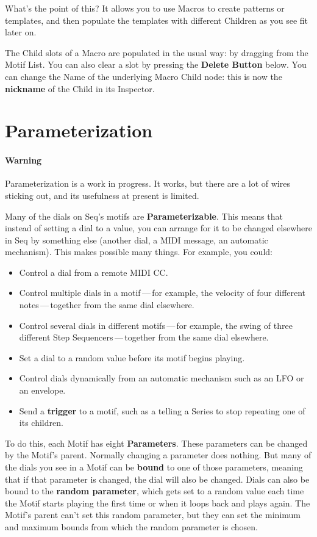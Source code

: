 \documentclass[twoside,10pt]{article}
\begin{document}
What's the point of this?  It allows you to use Macros to create patterns or templates, and then populate the templates with different Children as you see fit later on. 

The Child slots of a Macro are populated in the usual way: by dragging from the Motif List.  You can also clear a slot by pressing the {\bf Delete Button} below.  You can change the Name of the underlying Macro Child node: this is now the {\bf nickname} of the Child in its Inspector.

\clearpage\section{Parameterization}
\label{parameters}

\paragraph{\color{red} Warning}  Parameterization is a work in progress.  It works, but there are a lot of wires sticking out, and its usefulness at present is limited.

\vspace{1em}

Many of the dials on Seq's motifs are {\bf Parameterizable}.  This means that instead of setting a dial to a value, you can arrange for it to be changed elsewhere in Seq by something else (another dial, a MIDI message, an automatic mechanism).  This makes possible many things.  For example, you could:

\begin{itemize}
\item Control a dial from a remote MIDI CC.
\item Control multiple dials in a motif\,---\,for example, the velocity of four different notes\,---\,together from the same dial elsewhere.
\item Control several dials in different motifs\,---\,for example, the swing of three different Step Sequencers\,---\,together from the same dial elsewhere.
\item Set a dial to a random value before its motif begins playing.
\item Control dials dynamically from an automatic mechanism such as an LFO or an envelope.
\item Send a {\bf trigger} to a motif, such as a telling a Series to stop repeating one of its children.
\end{itemize}

To do this, each Motif has eight {\bf Parameters}.   These parameters can be changed by the Motif's parent.  Normally changing a parameter does nothing.  But many of the dials you see in a Motif can be {\bf bound} to one of those parameters, meaning that if that parameter is changed, the dial will also be changed.  Dials can also be bound to the {\bf random parameter}, which gets set to a random value each time the Motif starts playing the first time or when it loops back and plays again.  The Motif's parent can't set this random parameter, but they can set the minimum and maximum bounds from which the random parameter is chosen.
\end{document}
